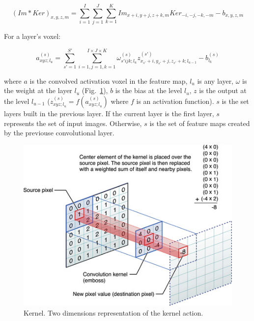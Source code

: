 \documentclass[final, paper=letter,5p,times,twocolumn]{elsarticle}
\begin{document}
\begin{equation*}
    (Im*Ker)_{x,y,z,m} =  \sum_{i=1}^{I}\sum_{j=1}^{J}\sum_{k=1}^{K}Im_{x+i,y+j,z+k,m}Ker_{-i,-j,-k,-m} - b_{x,y,z,m}
  \label{eq:convolution_tot} 
\end{equation*}

For a layer's voxel:

\begin{equation}
    a_{xyz;l_{u}}^{(s)} =  \sum_{s'=1}^{S'}\sum_{i=1,j=1,k=1}^{I \times J \times K}\omega_{s'ijk;l_{u}}^{(s)}z_{x_{s'}+i,y_{s'}+j,z_{s'}+k;l_{u-1}}^{(s')} - b_{l_{k}}^{(s)}
  \label{eq:convolution_tot_vox} 
\end{equation}

where $a$ is the convolved activation voxel in the feature map, $l_{u}$ is any layer, $\omega$ is the weight at the layer $l_{u}$ (Fig.~\ref{fig:Kernel}), $b$ is the bias at the level $l_{u}$, $z$ is the output at the level $l_{u-1}$ ($z_{xyz;l_{u}}^{(s)} = f(a_{xyz;l_{u}}^{(s)})$ where $f$ is an activation function). $s$ is the set layers built in the previous layer. If the current layer is the first layer, $s$ represents the set of input images. Otherwise, $s$ is the set of feature maps created by the previouse convolutional layer.



\begin{figure}[htbp]
   \begin{center}
      \includegraphics[scale=0.3, angle=0]{images/GvsBA.jpg}
   \end{center}
   \caption{Kernel. Two dimensions representation of the kernel action.}
  \label{fig:Kernel} 
\end{figure}
\end{document}
